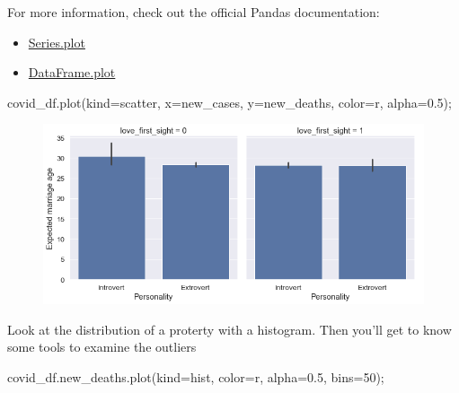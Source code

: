 \documentclass[
  letterpaper,
  DIV=11,
  numbers=noendperiod]{scrreprt}
\newenvironment{Shaded}{\begin{snugshade}}{\end{snugshade}}
\newcommand{\DecValTok}[1]{\textcolor[rgb]{0.68,0.00,0.00}{#1}}
\newcommand{\FloatTok}[1]{\textcolor[rgb]{0.68,0.00,0.00}{#1}}
\newcommand{\NormalTok}[1]{\textcolor[rgb]{0.00,0.23,0.31}{#1}}
\newcommand{\OperatorTok}[1]{\textcolor[rgb]{0.37,0.37,0.37}{#1}}
\newcommand{\StringTok}[1]{\textcolor[rgb]{0.13,0.47,0.30}{#1}}
\providecommand{\tightlist}{%
  \setlength{\itemsep}{0pt}\setlength{\parskip}{0pt}}\usepackage{longtable,booktabs,array}
\begin{document}
For more information, check out the official Pandas documentation:

\begin{itemize}
\tightlist
\item
  \href{https://pandas.pydata.org/docs/reference/api/pandas.Series.plot.html}{Series.plot}
\item
  \href{https://pandas.pydata.org/docs/reference/api/pandas.DataFrame.plot.html}{DataFrame.plot}
\end{itemize}

\begin{Shaded}
\begin{Highlighting}[]
\NormalTok{covid\_df.plot(kind}\OperatorTok{=}\StringTok{\textquotesingle{}scatter\textquotesingle{}}\NormalTok{, x}\OperatorTok{=}\StringTok{\textquotesingle{}new\_cases\textquotesingle{}}\NormalTok{, y}\OperatorTok{=}\StringTok{\textquotesingle{}new\_deaths\textquotesingle{}}\NormalTok{, color}\OperatorTok{=}\StringTok{\textquotesingle{}r\textquotesingle{}}\NormalTok{, alpha}\OperatorTok{=}\FloatTok{0.5}\NormalTok{)}\OperatorTok{;}
\end{Highlighting}
\end{Shaded}

\begin{figure}[H]

{\centering \includegraphics{Data visualization_files/figure-pdf/cell-33-output-1.png}

}

\end{figure}

Look at the distribution of a proterty with a histogram. Then you'll get
to know some tools to examine the outliers

\begin{Shaded}
\begin{Highlighting}[]
\NormalTok{covid\_df.new\_deaths.plot(kind}\OperatorTok{=}\StringTok{\textquotesingle{}hist\textquotesingle{}}\NormalTok{, color}\OperatorTok{=}\StringTok{\textquotesingle{}r\textquotesingle{}}\NormalTok{, alpha}\OperatorTok{=}\FloatTok{0.5}\NormalTok{, bins}\OperatorTok{=}\DecValTok{50}\NormalTok{)}\OperatorTok{;}
\end{Highlighting}
\end{Shaded}
\end{document}
